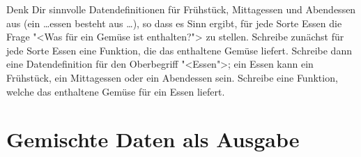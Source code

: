 \begin{aufgabeinline}
  Denk Dir sinnvolle Datendefinitionen für Frühstück, Mittagessen und
  Abendessen aus (ein \ldots{}essen besteht aus \ldots), so dass es
  Sinn ergibt, für jede Sorte Essen die Frage "<Was für ein Gemüse ist
  enthalten?"> zu stellen.  Schreibe zunächst für jede Sorte Essen
  eine Funktion, die das enthaltene Gemüse liefert.  Schreibe dann
  eine Datendefinition für den Oberbegriff "<Essen">; ein Essen kann
  ein Frühstück, ein Mittagessen oder ein Abendessen sein.  Schreibe
  eine Funktion, welche das enthaltene Gemüse für ein Essen liefert.
\end{aufgabeinline}

\section{Gemischte Daten als Ausgabe}
\label{sec:feed-animal}

